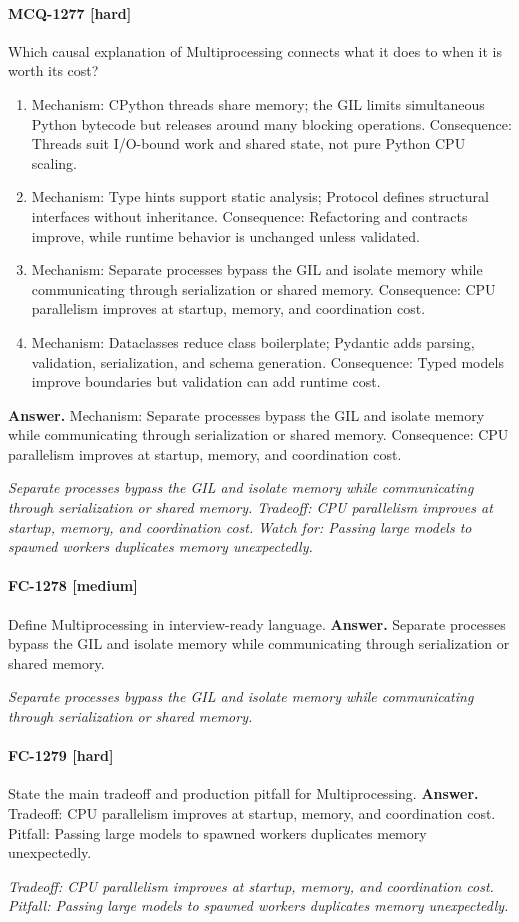 \paragraph{MCQ-1277 [hard]} Which causal explanation of Multiprocessing connects what it does to when it is worth its cost?
\begin{enumerate}[label=\Alph*.]
\item Mechanism: CPython threads share memory; the GIL limits simultaneous Python bytecode but releases around many blocking operations. Consequence: Threads suit I/O-bound work and shared state, not pure Python CPU scaling.
\item Mechanism: Type hints support static analysis; Protocol defines structural interfaces without inheritance. Consequence: Refactoring and contracts improve, while runtime behavior is unchanged unless validated.
\item Mechanism: Separate processes bypass the GIL and isolate memory while communicating through serialization or shared memory. Consequence: CPU parallelism improves at startup, memory, and coordination cost.
\item Mechanism: Dataclasses reduce class boilerplate; Pydantic adds parsing, validation, serialization, and schema generation. Consequence: Typed models improve boundaries but validation can add runtime cost.
\end{enumerate}
\noindent\textbf{Answer.} Mechanism: Separate processes bypass the GIL and isolate memory while communicating through serialization or shared memory. Consequence: CPU parallelism improves at startup, memory, and coordination cost.
\par\textit{Separate processes bypass the GIL and isolate memory while communicating through serialization or shared memory. Tradeoff: CPU parallelism improves at startup, memory, and coordination cost. Watch for: Passing large models to spawned workers duplicates memory unexpectedly.}
\paragraph{FC-1278 [medium]} Define Multiprocessing in interview-ready language.
\noindent\textbf{Answer.} Separate processes bypass the GIL and isolate memory while communicating through serialization or shared memory.
\par\textit{Separate processes bypass the GIL and isolate memory while communicating through serialization or shared memory.}
\paragraph{FC-1279 [hard]} State the main tradeoff and production pitfall for Multiprocessing.
\noindent\textbf{Answer.} Tradeoff: CPU parallelism improves at startup, memory, and coordination cost. Pitfall: Passing large models to spawned workers duplicates memory unexpectedly.
\par\textit{Tradeoff: CPU parallelism improves at startup, memory, and coordination cost. Pitfall: Passing large models to spawned workers duplicates memory unexpectedly.}
